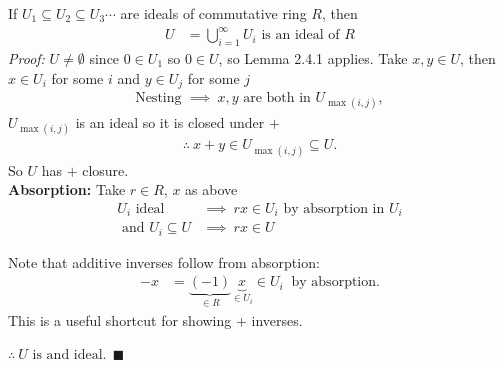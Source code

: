 \begin{lemma*}
    If $U_1 \subseteq U_2 \subseteq U_3 \cdots$ are ideals of commutative ring $R$, then
    \begin{align*}
        U &= \bigcup_{i=1}^\infty U_i \text{   is an ideal of }R
    \end{align*}
    \textit{Proof:} $U\neq \emptyset$ since $0\in U_1$ so $0\in U$, so Lemma 2.4.1 applies. Take
    $x,y\in U$, then $x\in U_i$ for some $i$ and $y\in U_j$ for some $j$
    \begin{align*}
        \text{Nesting } \implies \ x,y \text{ are both in } U_{\max(i,j)},
    \end{align*}
    $U_{\max(i,j)}$ is an ideal so it is closed under $+$
    \begin{align*}
        \therefore \ x+y \in U_{\max(i,j)} \subseteq U.
    \end{align*}
    So $U$ has $+$ closure. \\
    \textbf{Absorption:} Take $r\in R$, $x$ as above
    \begin{align*}
        U_i \text{ ideal }& \implies \ rx \in U_i \text{ by absorption in }U_i \\
        \text{ and }U_i \subseteq U &\implies \ rx \in U
    \end{align*}
    \begin{tcolorbox}
        Note that additive inverses follow from absorption:
        \begin{align*}
            -x &= \underbrace{(-1)}_{\in R}\underbrace{x}_{\in U_i} \in U_i \ \text{ by absorption}.
        \end{align*}
        This is a useful shortcut for showing $+$ inverses.
    \end{tcolorbox}
    $\therefore \ U \text{ is and ideal}. \ \ \blacksquare$
\end{lemma*}


